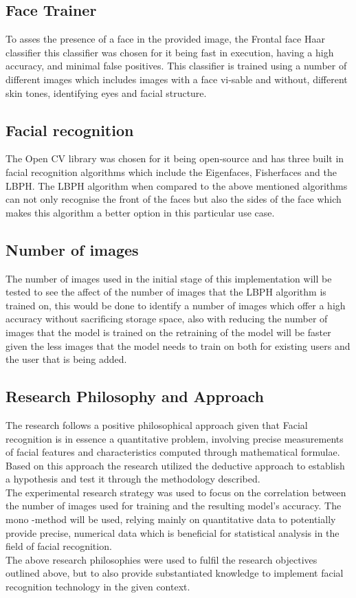 \documentclass[journal]{IEEEtran}
\begin{document}
\subsection{Face Trainer}
To asses the presence of a face in the provided image, the Frontal face  Haar classifier this classifier was chosen for it being fast in execution, having a high accuracy, and minimal false positives. This classifier is trained using a number of different images which includes images with a face vi-sable and without, different skin tones, identifying eyes and facial structure.

\subsection{Facial recognition}
The Open CV library was chosen for it being open-source and has three built in facial recognition algorithms which include the  Eigenfaces, Fisherfaces and the
LBPH. The LBPH algorithm when compared to the above mentioned algorithms can not only recognise the front of the faces but also the sides of the face which makes this algorithm a better option in this particular use case.

\subsection{Number of images}
The number of images used in the initial stage of this implementation will be tested to see the affect of the number of images that the LBPH algorithm is trained on, this would be done to identify a number of images which offer a high accuracy without sacrificing storage space, also with reducing the number of images that the model is trained on the retraining of the model will be faster given the less images that the model needs to train on both for existing users and the user that is being added.

\subsection{Research Philosophy and Approach}
The research follows a positive philosophical approach given that Facial recognition is in essence a quantitative problem, involving precise measurements of facial features and characteristics computed through mathematical formulae. Based on this approach the research utilized the deductive approach to establish a hypothesis and test it through the methodology described.
\\
The experimental research strategy was used to focus on the correlation between the number of images used for training and the resulting model's accuracy. The mono -method will be used, relying mainly on quantitative data to potentially provide precise, numerical data which is beneficial for statistical analysis in the field of facial recognition.
\\The above research philosophies were used to fulfil the research objectives outlined above, but to also provide substantiated knowledge to implement facial recognition technology in the given context.
\end{document}
